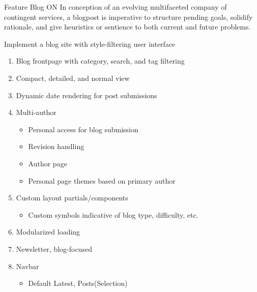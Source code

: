 \documentclass{article}
\begin{document}
\frontmatter
{Feature}
{Blog}
{ON}
{In conception of an evolving multifaceted company of contingent services, a blogpost is imperative to structure pending goals, solidify rationale, and give heuristics or sentience to both current and future problems.}

\strategy
{Implement a blog site with style-filtering user interface}
{
  \begin{enumerate}
    \item Blog frontpage with category, search, and tag filtering
    \item Compact, detailed, and normal view
    \item Dynamic date rendering for post submissions
    \item Multi-author
      \begin{itemize}[label=$\hookrightarrow$]
        \item Personal access for blog submission
        \item Revision handling
        \item Author page
        \item Personal page themes based on primary author
      \end{itemize}
    \item Custom layout partials/components
      \begin{itemize}[label=$\hookrightarrow$]
        \item Custom symbols indicative of blog type, difficulty, etc.
      \end{itemize}
    \item Modularized loading
    \item Newsletter, blog-focused
    \item Navbar
      \begin{itemize}[label=$\hookrightarrow$]
        \item Default\: Latest, Posts(Selection)
      \end{itemize}
  \end{enumerate}
}
{

}
{

}

\deploy
{

}
{

}

\report
{

}
\end{document}
